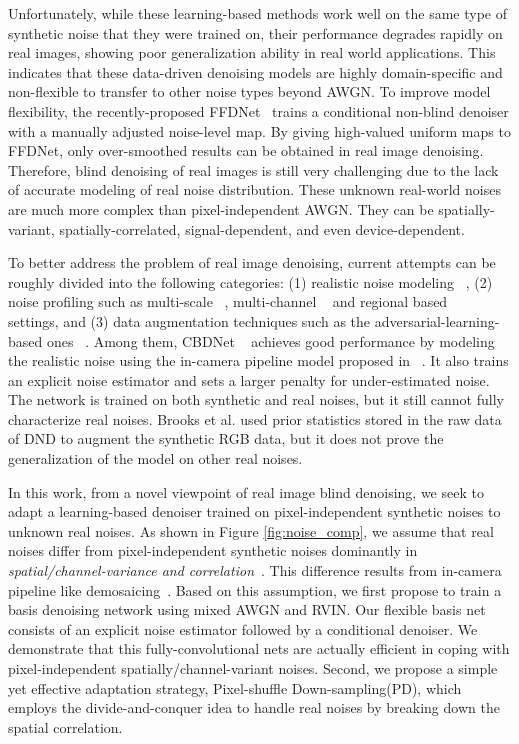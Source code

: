 \documentclass[letterpaper]{article} \usepackage{aaai20}  \usepackage{times}  \usepackage{helvet} \usepackage{courier}  \usepackage{comment}
\begin{document}
Unfortunately, while these learning-based methods work well on the same type of synthetic noise that they were trained on, their performance degrades rapidly on real images, showing poor generalization ability in real world applications. This indicates that these data-driven denoising models are highly domain-specific and non-flexible to transfer to other noise types beyond AWGN. To improve model flexibility, the recently-proposed FFDNet~\cite{zhang2018ffdnet} trains a conditional non-blind denoiser with a manually adjusted noise-level map. By giving high-valued uniform maps to FFDNet, only over-smoothed results can be obtained in real image denoising. Therefore, blind denoising of real images is still very challenging due to the lack of accurate modeling of real noise distribution. These unknown real-world noises are much more complex than pixel-independent AWGN. They can be  spatially-variant, spatially-correlated, signal-dependent, and even device-dependent. 

To better address the problem of real image denoising, current attempts can be roughly divided into the following categories: (1) realistic noise modeling ~\cite{guo2018toward,brooks2019unprocessing,abdelhamed2019ntire}, (2) noise profiling such as multi-scale ~\cite{lebrun2015multiscale,yair2018multi}, multi-channel ~\cite{xu2017multi} and regional based ~\cite{liu2017image} settings, and (3) data augmentation techniques such as the adversarial-learning-based ones ~\cite{chen2018image}. Among them, CBDNet ~\cite{guo2018toward} achieves good performance by modeling the realistic noise using the in-camera pipeline model proposed in ~\cite{liu2008automatic}. It also trains an explicit noise estimator and sets a larger penalty for under-estimated noise. The network is trained on both synthetic and real noises, but it still cannot fully characterize real noises. Brooks et al. \cite{brooks2019unprocessing} used prior statistics stored in the raw data of DND to augment the synthetic RGB data, but it does not prove the generalization of the model on other real noises. 

In this work, from a novel viewpoint of real image blind denoising, we seek to adapt a learning-based denoiser trained on pixel-independent synthetic noises to unknown real noises. As shown in Figure \ref{fig:noise_comp}, we assume that real noises differ from pixel-independent synthetic noises dominantly in {\em spatial/channel-variance and correlation}~\cite{DD}. This difference results from in-camera pipeline like demosaicing~\cite{zhou2019adaptation}. Based on this assumption, we first propose to train a basis denoising network using mixed AWGN and RVIN. Our flexible basis net consists of an explicit noise estimator followed by a conditional denoiser. We demonstrate that this fully-convolutional nets are actually efficient in coping with pixel-independent spatially/channel-variant noises. Second, we propose a simple yet effective adaptation strategy, Pixel-shuffle Down-sampling(PD), which employs the divide-and-conquer idea to handle real noises by breaking down the spatial correlation.  
\end{document}
